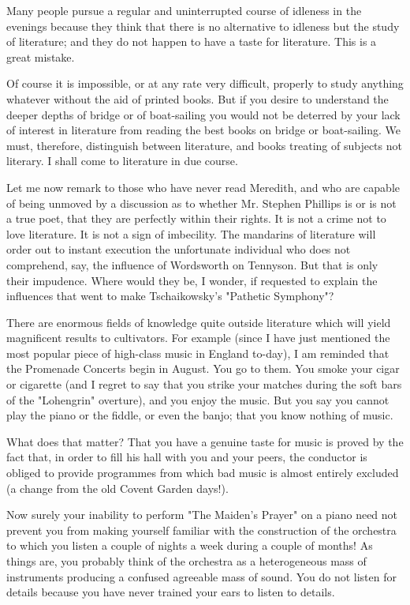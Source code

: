 Many people pursue a regular and uninterrupted course of idleness in
the evenings because they think that there is no alternative to
idleness but the study of literature; and they do not happen to have a
taste for literature.  This is a great mistake.

Of course it is impossible, or at any rate very difficult, properly to
study anything whatever without the aid of printed books.  But if you
desire to understand the deeper depths of bridge or of boat-sailing you
would not be deterred by your lack of interest in literature from
reading the best books on bridge or boat-sailing. We must, therefore,
distinguish between literature, and books treating of subjects not
literary.  I shall come to literature in due course.

Let me now remark to those who have never read Meredith, and who are
capable of being unmoved by a discussion as to whether Mr. Stephen
Phillips is or is not a true poet, that they are perfectly within their
rights. It is not a crime not to love literature.  It is not a sign of
imbecility.  The mandarins of literature will order out to instant
execution the unfortunate individual who does not comprehend, say, the
influence of Wordsworth on Tennyson.  But that is only their impudence.
Where would they be, I wonder, if requested to explain the influences
that went to make Tschaikowsky's "Pathetic Symphony"?

There are enormous fields of knowledge quite outside literature which
will yield magnificent results to cultivators.  For example (since I
have just mentioned the most popular piece of high-class music in
England to-day), I am reminded that the Promenade Concerts begin in
August. You go to them.  You smoke your cigar or cigarette (and I
regret to say that you strike your matches during the soft bars of the
"Lohengrin" overture), and you enjoy the music.  But you say you cannot
play the piano or the fiddle, or even the banjo; that you know nothing
of music.

What does that matter?  That you have a genuine taste for music is
proved by the fact that, in order to fill his hall with you and your
peers, the conductor is obliged to provide programmes from which bad
music is almost entirely excluded (a change from the old Covent Garden
days!).

Now surely your inability to perform "The Maiden's Prayer" on a piano
need not prevent you from making yourself familiar with the
construction of the orchestra to which you listen a couple of nights a
week during a couple of months!  As things are, you probably think of
the orchestra as a heterogeneous mass of instruments producing a
confused agreeable mass of sound.  You do not listen for details
because you have never trained your ears to listen to details.

